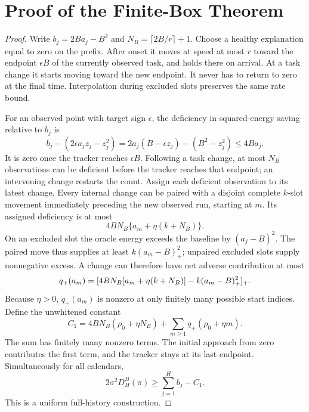 \section{Proof of the Finite-Box Theorem}
\begin{proof}
Write $b_j=2Ba_j-B^2$ and $N_B=\lceil2B/r\rceil+1$. Choose a healthy explanation equal to zero on the prefix. After onset it moves at speed at most $r$ toward the endpoint $\epsilon B$ of the currently observed task, and holds there on arrival. At a task change it starts moving toward the new endpoint. It never has to return to zero at the final time. Interpolation during excluded slots preserves the same rate bound.

For an observed point with target sign $\epsilon$, the deficiency in squared-energy saving relative to $b_j$ is
\begin{equation}
 b_j-(2\epsilon a_jz_j-z_j^2)
 =2a_j(B-\epsilon z_j)-(B^2-z_j^2)\le4Ba_j.
\end{equation}
It is zero once the tracker reaches $\epsilon B$. Following a task change, at most $N_B$ observations can be deficient before the tracker reaches that endpoint; an intervening change restarts the count. Assign each deficient observation to its latest change. Every internal change can be paired with a disjoint complete $k$-slot movement immediately preceding the new observed run, starting at $m$. Its assigned deficiency is at most
\begin{equation}
 4BN_B\{a_m+\eta(k+N_B)\}.
\end{equation}
On an excluded slot the oracle energy exceeds the baseline by $(a_j-B)^2$. The paired move thus supplies at least $k(a_m-B)_+^2$; unpaired excluded slots supply nonnegative excess. A change can therefore have net adverse contribution at most
\begin{equation}
 q_+(a_m)=[4BN_B[a_m+\eta(k+N_B)]-k(a_m-B)_+^2]_+.
\end{equation}
Because $\eta>0$, $q_+(a_m)$ is nonzero at only finitely many possible start indices. Define the unwhitened constant
\begin{equation}
 C_1=4BN_B(\rho_0+\eta N_B)+\sum_{m\ge1}q_+(\rho_0+\eta m).
\end{equation}
The sum has finitely many nonzero terms. The initial approach from zero contributes the first term, and the tracker stays at its last endpoint. Simultaneously for all calendars,
\begin{equation}
 2\sigma^2D_H^B(\pi)\ge\sum_{j=1}^Hb_j-C_1.\label{eq:finiteLower}
\end{equation}
This is a uniform full-history construction.


\end{proof}
